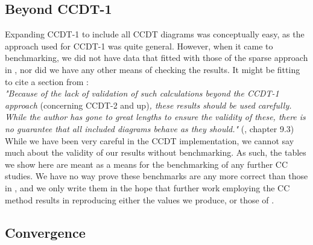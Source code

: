 \documentclass[10pt,twoside]{report}
\begin{document}
	\subsection{Beyond CCDT-1}
	Expanding CCDT-1 to include all CCDT diagrams was conceptually easy, as the approach used for CCDT-1 was quite general. However, when it came to benchmarking, we did not have data that fitted with those of the sparse approach in \cite{Hansen15}, nor did we have any other means of checking the results. It might be fitting to cite a section from \cite{Hansen15}:\\
	
	\emph{"Because of the lack of validation of such calculations beyond the CCDT-1 approach} (concerning CCDT-2 and up)\emph{,
		these results should be used carefully. While the author has gone to great lengths to
		ensure the validity of these, there is no guarantee that all included diagrams behave as
		they should."} (\cite{Hansen15}, chapter 9.3)\\
	
	While we have been very careful in the CCDT implementation, we cannot say much about the validity of our results without benchmarking. As such, the tables we show here are meant as a means for the benchmarking of any further CC studies. We have no way prove these benchmarks are any more correct than those in \cite{Hansen15}, and we only write them in the hope that further work employing the CC method results in reproducing either the values we produce, or those of \cite{Hansen15}.
	
	\subsection{Convergence}
	
\end{document}
